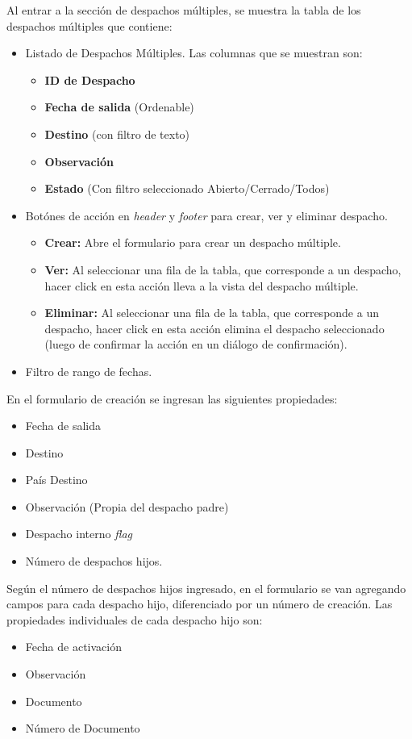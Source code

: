 Al entrar a la sección de despachos múltiples, se muestra la tabla de los despachos múltiples que contiene:
\begin{itemize}
    \item Listado de Despachos Múltiples. Las columnas que se muestran son:
    \begin{itemize}
        \item \textbf{ID de Despacho}
        \item \textbf{Fecha de salida} (Ordenable)
        \item \textbf{Destino} (con filtro de texto)
        \item \textbf{Observación}
        \item \textbf{Estado} (Con filtro seleccionado Abierto/Cerrado/Todos)
    \end{itemize}
    \item Botónes de acción en \textit{header} y \textit{footer} para crear, ver y eliminar despacho.
    \begin{itemize}
        \item \textbf{Crear:} Abre el formulario para crear un despacho múltiple.
        \item \textbf{Ver:} Al seleccionar una fila de la tabla, que corresponde a un despacho, hacer click en esta acción lleva a la vista del despacho múltiple.
        \item \textbf{Eliminar:} Al seleccionar una fila de la tabla, que corresponde a un despacho, hacer click en esta acción elimina el despacho seleccionado (luego de confirmar la acción en un diálogo de confirmación).
    \end{itemize}
    \item Filtro de rango de fechas.
\end{itemize}

En el formulario de creación se ingresan las siguientes propiedades:
\begin{itemize}
    \item Fecha de salida
    \item Destino
    \item País Destino
    \item Observación (Propia del despacho padre)
    \item Despacho interno \textit{flag}    
    \item Número de despachos hijos.
\end{itemize}

Según el número de despachos hijos ingresado, en el formulario se van agregando campos para cada despacho hijo, diferenciado por un número de creación. Las propiedades individuales de cada despacho hijo son:
\begin{itemize}
    \item Fecha de activación
    \item Observación
    \item Documento
    \item Número de Documento
\end{itemize}

